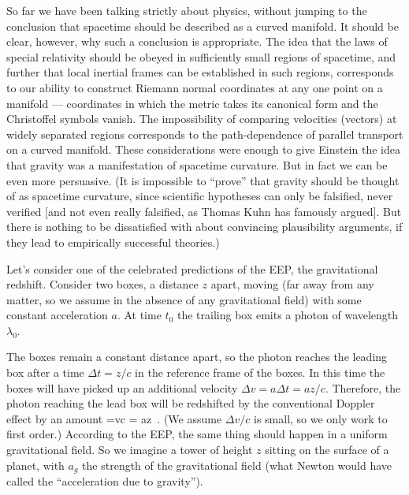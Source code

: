 So far we have been talking strictly about physics, without jumping
to the conclusion that spacetime should be described as a curved manifold.
It should be clear, however, why such a conclusion is appropriate.
The idea that the laws of special relativity should be obeyed in
sufficiently small regions of spacetime, and further that local inertial 
frames can be established in such regions, corresponds to our ability
to construct Riemann normal coordinates at any one point on a manifold ---
coordinates in which the metric takes its canonical form and the Christoffel 
symbols vanish.  The impossibility of comparing velocities (vectors) at 
widely separated regions corresponds to the path-dependence of 
parallel transport on a curved manifold.  These considerations were
enough to give Einstein the idea that gravity was a manifestation of
spacetime curvature.  But in fact we can be even more persuasive.
(It is impossible to ``prove'' that gravity should be thought of as
spacetime curvature, since scientific hypotheses can only be falsified,
never verified [and not even really falsified, as Thomas Kuhn has famously
argued].  But there is nothing to be dissatisfied with about convincing
plausibility arguments, if they lead to empirically successful theories.)

Let's consider one of the celebrated predictions of the EEP, the
gravitational redshift.  Consider two boxes, a distance $z$ apart,
moving (far away from any matter, so we assume in the absence of any
gravitational field) with some constant acceleration $a$.  At
time $t_0$ the trailing box emits a photon of wavelength $\lambda_0$.

\eject

\begin{figure}
  \centerline{
  }
\end{figure}

The boxes remain a constant distance apart, so the photon reaches
the leading box after a time $\Delta t = z/c$ in the reference frame
of the boxes.  In this time the boxes will have picked up an additional
velocity $\Delta v = a\Delta t = az/c$.  Therefore, the photon reaching 
the lead box will be redshifted by the conventional Doppler effect by
an amount
\be
  {{\Delta \lambda}}={{\Delta v}\over c} =
  {{az}}\ .\label{4.5}
\ee
(We assume $\Delta v/c$ is small, so we only work to first order.)
According to the EEP, the same thing should happen in a uniform
gravitational field.  So we imagine a tower of height $z$ sitting
on the surface of a planet, with $a_g$ the strength of the gravitational
field (what Newton would have called the ``acceleration due to gravity'').

